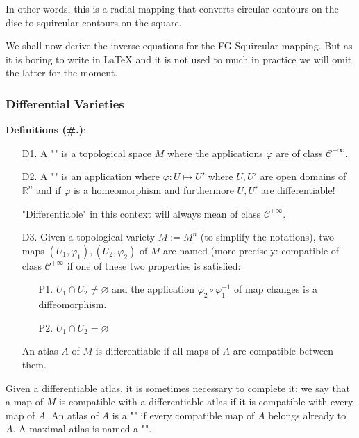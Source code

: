 	In other words, this is a radial mapping that converts circular contours on the disc to squircular contours on the square.
	
	We shall now derive the inverse equations for the FG-Squircular mapping. But as it is boring to write in \LaTeX{} and it is not used to much in practice we will omit the latter for the moment.
	
	\subsubsection{Differential Varieties}
	\textbf{Definitions (\#\thesection.\mydef)}:
	\begin{enumerate}
		\item[D1.] A "" is a topological space $M$ where the applications $\varphi$ are of class $\mathcal{C}^{+\infty}$.

		\item[D2.] A "" is an application where $\varphi: U\mapsto U' $ where $U,U'$ are open domains of $\mathbb{R}^n$ and if $\varphi$ is a homeomorphism and furthermore $U,U'$ are differentiable!
		\begin{tcolorbox}[title=Remark,arc=10pt,breakable,drop lifted shadow,
  skin=enhanced,
  skin first is subskin of={enhancedfirst}{arc=10pt,no shadow},
  skin middle is subskin of={enhancedmiddle}{arc=10pt,no shadow},
  skin last is subskin of={enhancedlast}{drop lifted shadow}]
		"Differentiable" in this context will always mean of class $\mathcal{C}^{+\infty}$.
		\end{tcolorbox}

		\item[D3.] Given a topological variety $M:=M^n$ (to simplify the notations), two maps $(U_1,\varphi_1),(U_2,\varphi_2)$ of $M$ are named  (more precisely: compatible of class $\mathcal{C}^{+\infty}$ if one of these two properties is satisfied:
		\begin{enumerate}
			\item[P1.] $U_1\cap U_2\neq \varnothing$ and the application $\varphi_2\circ \varphi_1^{-1}$ of map changes is a diffeomorphism.

			\item[P2.] $U_1\cap U_2 =\varnothing$
		\end{enumerate}
		An atlas $A$ of $M$ is differentiable if all maps of $A$ are compatible between them.
	\end{enumerate}
	\begin{tcolorbox}[title=Remark,arc=10pt,breakable,drop lifted shadow,
  skin=enhanced,
  skin first is subskin of={enhancedfirst}{arc=10pt,no shadow},
  skin middle is subskin of={enhancedmiddle}{arc=10pt,no shadow},
  skin last is subskin of={enhancedlast}{drop lifted shadow}]
	Given a differentiable atlas, it is sometimes necessary to complete it: we say that a map of $M$ is compatible with a differentiable atlas if it is compatible with every map of $A$. An atlas of $A$ is a "" if every compatible map of $A$ belongs already to $A$. A maximal atlas is named a "".
	\end{tcolorbox}

